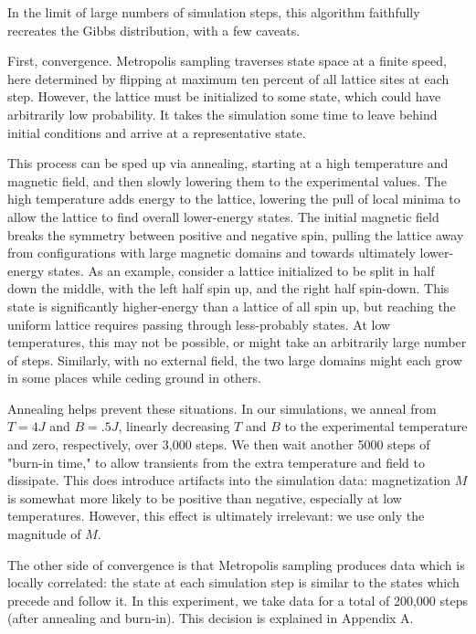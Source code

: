 \documentclass[letter,scriptaddress,twocolumn, prl]{revtex4}
\begin{document}
In the limit of large numbers of simulation steps, this algorithm faithfully recreates the Gibbs distribution, with a few caveats.

First, convergence. Metropolis sampling traverses state space at a finite speed, here determined by flipping at maximum ten percent of all lattice sites at each step. However, the lattice must be initialized to some state, which could have arbitrarily low probability. It takes the simulation some time to leave behind initial conditions and arrive at a representative state. 

This process can be sped up via annealing, starting at a high temperature and magnetic field, and then slowly lowering them to the experimental values. The high temperature adds energy to the lattice, lowering the pull of local minima to allow the lattice to find overall lower-energy states. The initial magnetic field breaks the symmetry between positive and negative spin, pulling the lattice away from configurations with large magnetic domains and towards ultimately lower-energy states. As an example, consider a lattice initialized to be split in half down the middle, with the left half spin up, and the right half spin-down. This state is significantly higher-energy than a lattice of all spin up, but reaching the uniform lattice requires passing through less-probably states. At low temperatures, this may not be possible, or might take an arbitrarily large number of steps. Similarly, with no external field, the two large domains might each grow in some places while ceding ground in others. 

Annealing helps prevent these situations. In our simulations, we anneal from $T = 4 J$ and $B = .5 J$, linearly decreasing $T$ and $B$ to the experimental temperature and zero, respectively, over 3,000 steps. We then wait another 5000 steps of "burn-in time," to allow transients from the extra temperature and field to dissipate. This does introduce artifacts into the simulation data: magnetization $M$ is somewhat more likely to be positive than negative, especially at low temperatures. However, this effect is ultimately irrelevant: we use only the magnitude of $M$.

The other side of convergence is that Metropolis sampling produces data which is locally correlated: the state at each simulation step is similar to the states which precede and follow it. In this experiment, we take data for a total of 200,000 steps (after annealing and burn-in). This decision is explained in Appendix A.
\end{document}
